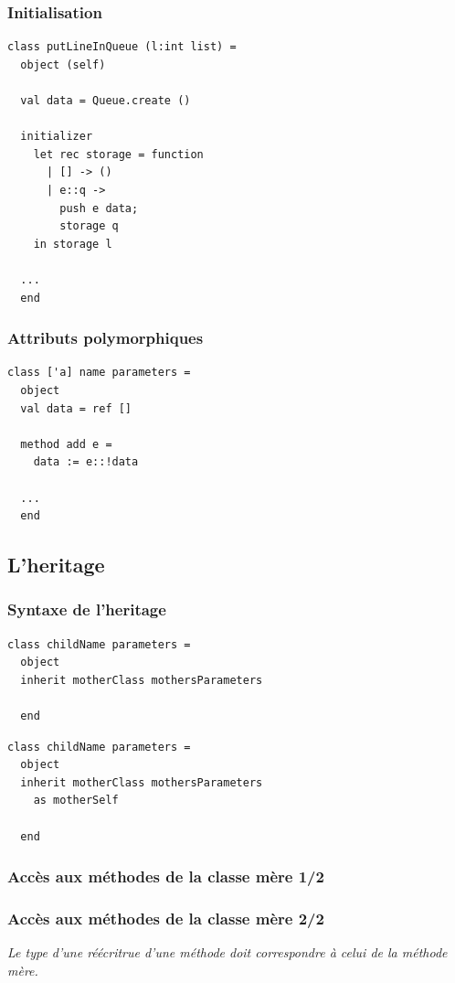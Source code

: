 \begin{frame}[fragile]
	\frametitle{Initialisation}
	\begin{lstlisting}
class putLineInQueue (l:int list) =
  object (self)
    
  val data = Queue.create ()

  initializer
    let rec storage = function
      | [] -> ()
      | e::q -> 
        push e data;
        storage q
    in storage l

  ...
  end
	\end{lstlisting}
\end{frame}

\begin{frame}[fragile]
	\frametitle{Attributs polymorphiques}
	\begin{lstlisting}
class ['a] name parameters =
  object 
  val data = ref []

  method add e =
    data := e::!data
  
  ...
  end
	\end{lstlisting}
\end{frame}

\subsection{L'heritage} %
\begin{frame}[fragile]
	\frametitle{Syntaxe de l'heritage}
	\begin{lstlisting}
class childName parameters =
  object
  inherit motherClass mothersParameters

  end
	\end{lstlisting}
	\begin{lstlisting}
class childName parameters =
  object
  inherit motherClass mothersParameters 
    as motherSelf

  end
	\end{lstlisting}
\end{frame}

\begin{frame}
	\frametitle{Accès aux méthodes de la classe mère 1/2}
	
\end{frame}

\begin{frame}
	\frametitle{Accès aux méthodes de la classe mère 2/2}
	\textit{Le type d'une réécritrue d'une méthode doit correspondre à celui de la méthode mère.}
	
\end{frame}
